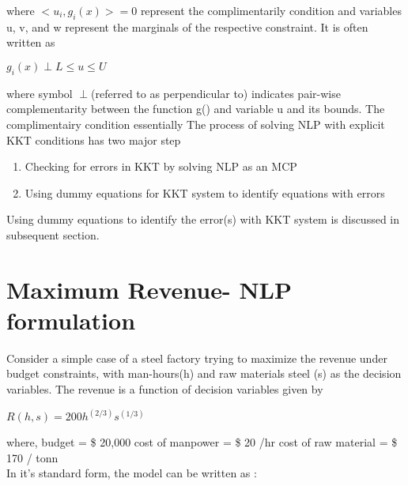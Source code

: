 \documentclass{article}
\begin{document}
where $<u_{i},g_{i}(x)> = 0$  represent the complimentarily condition and variables u, v, and w represent the marginals of the respective constraint. It is often written as 

 $g_{i}(x) \perp L \leq u \leq U $

where symbol $\perp $(referred to as perpendicular  to) indicates pair-wise complementarity between the function g() and variable u and its bounds. The complimentairy condition essentially 
The process of solving NLP with explicit KKT conditions has two major step

\begin{enumerate}
	\item Checking for errors in KKT by solving NLP as an MCP
	\item Using dummy equations for KKT system to identify equations with errors
\end{enumerate}
Using dummy equations to identify the error(s) with KKT system is discussed in subsequent section. 

\begin{comment}
\begin{enumerate}
	\item Solve NLP without explicit KKT conditions
	\item	 Solve problem as MCP using the KKT conditions with solution from step 1 as initial point
	\item If MCP iteration count is > 1, there exists a problem with one of the KKT conditions.
\end{enumerate}
Identification and tracing of the error is covered in subsequent sections
\end{comment}

\section{Maximum Revenue- NLP formulation}

Consider a simple case of a steel factory trying to maximize the revenue under budget constraints, with man-hours(h) and raw materials steel (s) as the decision variables. The revenue is a function of decision variables given by \\

\centerline{$R(h,s) = 200 h^{(2/3)}s^{(1/3)} $ }
\bigbreak
\noindent where, budget = \$ 20,000
cost of manpower = \$ 20 /hr
cost of raw material = \$ 170 / tonn \\

\noindent In it's standard form, the model can be written as :
\end{document}

